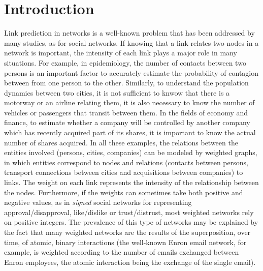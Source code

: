 \section{Introduction}

Link prediction in networks is a well-known problem that has been addressed by many studies, as \cite{Liben2007,Zaki2011,Martinez2016} for social networks. If knowing that a link relates two nodes in a network is important, the intensity of each link plays a major role in many situations. For example, in epidemiology, the number of contacts between two persons is an important factor to accurately estimate the probability of contagion between from one person to the other. Similarly, to understand the population dynamics between two cities, it is not sufficient to knwow that there is a motorway or an airline relating them, it is also necessary to know the number of vehicles or passengers that transit between them. In the fields of economy and finance, to estimate whether a company will be controlled by another company which has recently acquired part of its shares, it is important to know the actual number of shares acquired. In all these examples, the relations between the entities involved (persons, cities, companies) can be modeled by weighted graphs, in which entities correspond to nodes and relations (contacts between persons, transport connections between cities and acquisitions between companies) to links. The weight on each link represents the intensity of the relationship between the nodes. Furthermore, if the weights can sometimes take both positive and negative values, as in \textit{signed} social networks \cite{Kumar2016} for representing approval/disapproval, like/dislike or trust/distrust, most weighted networks rely on positive integers. The prevalence of this type of networks may be explained by the fact that many weighted networks are the results of the superposition, over time, of atomic, binary interactions (the well-known Enron email network, for example, is weighted according to the number of emails exchanged between Enron employees, the atomic interaction being the exchange of the single email).

